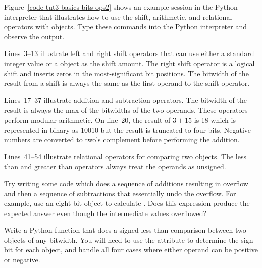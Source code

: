 \documentclass{cbxdoc}
\begin{document}
\begin{minipage}[t]{0.51\tw}
\setlength{\parskip}{0.5em}

  Figure~\ref{code-tut3-basics-bits-ops2} shows an example session in the
  Python interpreter that illustrates how to use the shift, arithmetic,
  and relational operators with  objects. Type these commands
  into the Python interpreter and observe the output.

  Lines~3--13 illustrate left and right shift operators that can use
  either a standard integer value or a  object as the shift
  amount. The right shift operator is a logical shift and inserts zeros
  in the most-significant bit positions. The bitwidth of the result from
  a shift is always the same as the first operand to the shift operator.

  Lines~17--37 illustrate addition and subtraction operators. The
  bitwidth of the result is always the max of the bitwidths of the two
  operands. These operators perform modular arithmetic. On line~20, the
  result of $3 + 15$ is 18 which is represented in binary as 10010 but
  the result is truncated to four bits. Negative numbers are converted to
  two's complement before performing the addition.

  Lines~41--54 illustrate relational operators for comparing two
   objects. The less than and greater than operators always
  treat the operands as unsigned.

  \begin{task}
    Try writing some code which does a sequence of additions resulting in
    overflow and then a sequence of subtractions that essentially undo
    the overflow. For example, use an eight-bit  object to
    calculate . Does this expression
    produce the expected answer even though the intermediate values
    overflowed?

    Write a Python function that does a signed less-than comparison
    between two  objects of any bitwidth. You will need to use
    the  attribute to determine the sign bit for each 
    object, and handle all four cases where either operand can be
    positive or negative.
  \end{task}

\end{minipage}
\hfill
\begin{minipage}[t]{0.46\tw}
  \vspace{-0.2in}

  
\end{minipage}
\end{document}
